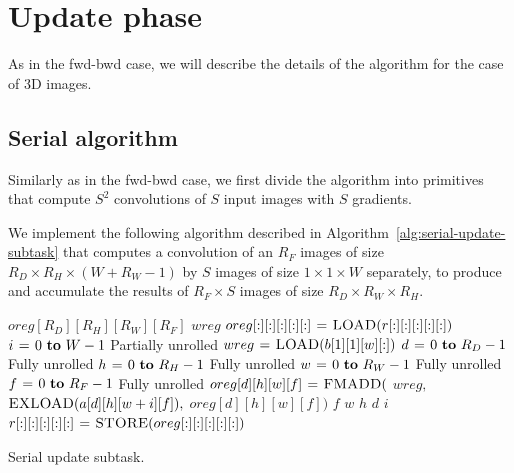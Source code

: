 \section{Update phase}



  As in the fwd-bwd case, we will describe the details of the
  algorithm for the case of 3D images.
  \subsection{Serial algorithm}

  Similarly as in the fwd-bwd case, we first divide the algorithm into
  primitives that compute $S^2$ convolutions of $S$ input images with
  $S$ gradients.

  We implement the following algorithm described in
  Algorithm~\ref{alg:serial-update-subtask} that computes a
  convolution of an $R_F$ images of size $R_D \times R_H \times (W + R_W
  - 1)$ by $S$ images of size $1 \times 1 \times W$ separately, to
  produce and accumulate the results of $R_F \times S$ images of size
  $R_D \times R_W \times R_H$.

  \begin{algorithm}
    {\footnotesize
      \begin{codebox}
        \li {} $oreg[R_D][R_H][R_W][R_F]$
        \li {} $wreg$
        \li $oreg[:][:][:][:][:] \mathrel{\hspace{1pt}=\hspace{1pt}} \textnormal{\scshape LOAD}(r[:][:][:][:][:])$
        \li \For $i \gets 0 \To W-1$ \Comment Partially unrolled
        \li   \Do $wreg \mathrel{\hspace{1pt}=\hspace{1pt}} \textnormal{\scshape LOAD}(b[1][1][w][:])$
        \li   \For $d \gets 0 \To R_D-1$ \Comment Fully unrolled
        \li   \Do \For $h \gets 0 \To R_H-1$  \Comment Fully unrolled
        \li   \Do \For $w \gets 0 \To R_W-1$  \Comment Fully unrolled
        \li       \For $f \gets 0 \To R_F-1$   \Comment Fully unrolled
        \li   \Do $oreg[d][h][w][f] \mathrel{\hspace{1pt}=\hspace{1pt}} \textnormal{\scshape FMADD}($
        \li   \Do $wreg,$
        \li       $\textnormal{\scshape EXLOAD}(a[d][h][w+i][f]),$
        \li       $oreg[d][h][w][f])$
        \End
        \End \li {} $f$
        \End \li {} $w$
        \End \li {} $h$
        \End \li {} $d$
        \End \li {} $i$
        \li $r[:][:][:][:][:] \mathrel{\hspace{1pt}=\hspace{1pt}} \textnormal{\scshape STORE}(oreg[:][:][:][:][:])$
      \end{codebox}
    \caption{Serial update subtask.}
    \label{alg:serial-update-subtask}
    }
  \end{algorithm}

